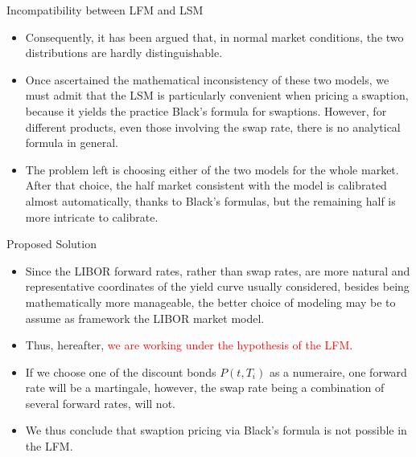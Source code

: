 \documentclass{beamer}
\begin{document}
\begin{frame}{Incompatibility between LFM and LSM}
	\begin{itemize}
	\item<1-> Consequently, it has been argued that, in normal market conditions, the two distributions are hardly distinguishable.
	\item<2-> Once ascertained the mathematical inconsistency of these two models, we must admit that the LSM is particularly convenient when pricing a swaption, because it yields the practice Black’s formula for swaptions. However, for different products, even those involving the swap rate, there is no analytical formula in general. 
  \item<3-> The problem left is choosing either of the two models for the whole market. After that choice, the half market consistent with the model is calibrated almost automatically, thanks to Black’s formulas, but the remaining half is more intricate to calibrate.
	\end{itemize}
\end{frame}

\begin{frame}{Proposed Solution}
  \begin{itemize}
  \item<1-> Since the LIBOR forward rates, rather than swap rates, are more natural and representative coordinates of the yield curve usually considered, besides being mathematically more manageable, the better choice of modeling may be to assume as framework the LIBOR market model. 
  \item<2-> Thus, hereafter, \textcolor{red}{we are working under the hypothesis of the LFM}.
  \item<3-> If we choose one of the discount bonds $P(t, T_i)$ as a numeraire, one forward rate will be a martingale, however, the swap rate being a combination of several forward rates, will not. 
  \item<4-> We thus conclude that swaption pricing via Black’s formula is not possible in the LFM.
    \end{itemize}
\end{frame}
\end{document}
